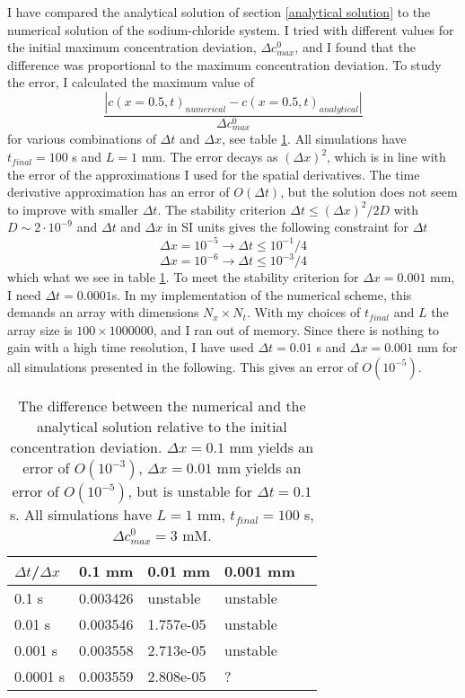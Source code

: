 \documentclass{article}
\begin{document}
I have compared the analytical solution of section \ref{analytical solution} to the numerical solution of the sodium-chloride system. I tried with different values for the initial maximum concentration deviation, $\Delta c^0_{max}$, and I found that the difference was proportional to the maximum concentration deviation. To study the error, I calculated the maximum value of
\begin{equation}
\frac{|c(x=0.5,t)_{numerical}-c(x=0.5,t)_{analytical}|}{\Delta c^0_{max}}
\end{equation}
for various combinations of $\Delta t$ and $\Delta x$, see table \ref{tab:error}. All simulations have $t_{final} = 100$ s and $L=1$ mm. The error decays as $(\Delta x)^2$, which is in line with the error of the  approximations I used for the spatial derivatives. The time derivative approximation has an error of $O(\Delta t)$, but the solution does not seem to improve with smaller $\Delta t$. The stability criterion $\Delta t \leq (\Delta x)^2/2D$ with $D \sim 2\cdot 10^{-9}$ and $\Delta t $ and $\Delta x$ in SI units gives the following constraint for $\Delta t$
$$\Delta x= 10^{-5} \rightarrow \Delta t \leq 10^{-1}/4$$
$$\Delta x= 10^{-6} \rightarrow \Delta t \leq 10^{-3}/4$$ 
which what we see in table \ref{tab:error}. To meet the stability criterion for $\Delta x = 0.001$ mm, I need $\Delta t = 0.0001$s. In my implementation of the numerical scheme, this demands an array with dimensions $N_x \times N_t$. With my choices of $t_{final}$ and $L$ the array size is  $100\times 1000 000$, and I ran out of memory.
Since there is nothing to gain with a high time resolution, I have used $\Delta t = 0.01$ s and $\Delta x = 0.001$ mm for all simulations presented in the following. This gives an error of $O(10^{-5})$. 
\begin{table}[h!]
  \centering
  \caption{The difference between the numerical and the analytical solution relative to the initial concentration deviation. $\Delta x =0.1$ mm yields an error of $O(10^{-3})$, $\Delta x =0.01$ mm yields an error of $O(10^{-5})$, but is unstable for $\Delta t = 0.1$ s. All simulations have $L=1$ mm, $t_ {final} =100$ s, $\Delta c^0_{max} =3$ mM.}
  \label{tab:error}
  \begin{tabular}{l||l|l|l|l}
$\Delta t$/$\Delta x$ & 0.1 mm & 0.01 mm & 0.001 mm  \\
\hline
0.1 s & 0.003426 &  unstable & unstable \\
0.01 s & 0.003546 & 1.757e-05  & unstable \\
0.001 s & 0.003558 & 2.713e-05 & unstable \\
0.0001 s & 0.003559& 2.808e-05 & ? \\

 \end{tabular}
\end{table}
\end{document}
